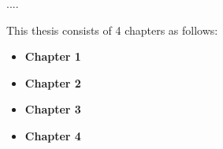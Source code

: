 ....

This thesis consists of 4 chapters as follows:
\begin{itemize}
	\item \textbf{Chapter 1} 
	\item \textbf{Chapter 2} 
	\item \textbf{Chapter 3} 
	\item \textbf{Chapter 4} 
\end{itemize}

